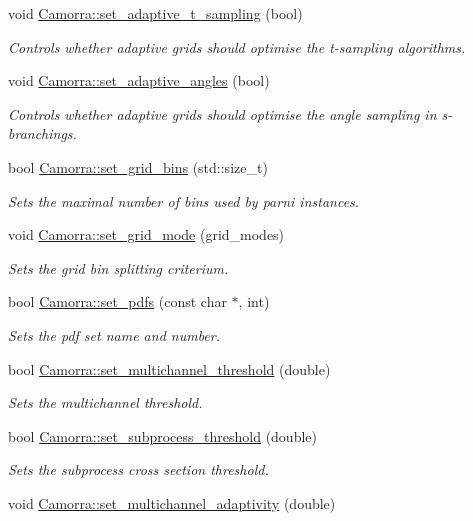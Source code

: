 \begin{DoxyCompactItemize}
void \hyperlink{a00798_ad5867bcc4ef7653a624ca13b33d1c691}{Camorra::set\_\-adaptive\_\-t\_\-sampling} (bool)
\begin{DoxyCompactList}\small\item\em Controls whether adaptive grids should optimise the t-\/sampling algorithms. \end{DoxyCompactList}\item 
void \hyperlink{a00798_a866e5cc645680018fab0fdcf72207c75}{Camorra::set\_\-adaptive\_\-angles} (bool)
\begin{DoxyCompactList}\small\item\em Controls whether adaptive grids should optimise the angle sampling in s-\/branchings. \end{DoxyCompactList}\item 
bool \hyperlink{a00798_a6d2bc8b8821a29006938082d6b6bef2d}{Camorra::set\_\-grid\_\-bins} (std::size\_\-t)
\begin{DoxyCompactList}\small\item\em Sets the maximal number of bins used by parni instances. \end{DoxyCompactList}\item 
\hypertarget{a00798_a7e1437ec1a247b7c32bd4923efabf6b6}{
void \hyperlink{a00798_a7e1437ec1a247b7c32bd4923efabf6b6}{Camorra::set\_\-grid\_\-mode} (grid\_\-modes)}
\label{a00798_a7e1437ec1a247b7c32bd4923efabf6b6}

\begin{DoxyCompactList}\small\item\em Sets the grid bin splitting criterium. \end{DoxyCompactList}\item 
bool \hyperlink{a00798_ac368b117d85d0b8799272b483b14c791}{Camorra::set\_\-pdfs} (const char $\ast$, int)
\begin{DoxyCompactList}\small\item\em Sets the pdf set name and number. \end{DoxyCompactList}\item 
bool \hyperlink{a00798_a3d412d1902455f35c2fbd020ed8651f5}{Camorra::set\_\-multichannel\_\-threshold} (double)
\begin{DoxyCompactList}\small\item\em Sets the multichannel threshold. \end{DoxyCompactList}\item 
bool \hyperlink{a00798_a2142e469e0d4ae0c098ecc1c5c18ed9e}{Camorra::set\_\-subprocess\_\-threshold} (double)
\begin{DoxyCompactList}\small\item\em Sets the subprocess cross section threshold. \end{DoxyCompactList}\item 
\hypertarget{a00798_a2615bb2dd06f477c200bbc06bd0afc66}{
void \hyperlink{a00798_a2615bb2dd06f477c200bbc06bd0afc66}{Camorra::set\_\-multichannel\_\-adaptivity} (double)}
\label{a00798_a2615bb2dd06f477c200bbc06bd0afc66}


\end{DoxyCompactItemize}
